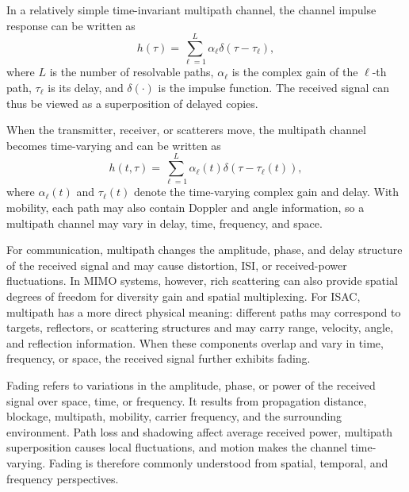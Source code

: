 In a relatively simple time-invariant multipath channel,
the channel impulse response can be written as
\begin{equation}
    h(\tau)
    =
    \sum_{\ell=1}^{L}
    \alpha_{\ell}
    \delta
    \left(
        \tau-\tau_{\ell}
    \right),
    \label{eq:time-invariant-multipath-channel}
\end{equation}
where \(L\) is the number of resolvable paths, \(\alpha_{\ell}\) is the
complex gain of the \(\ell\)-th path, \(\tau_{\ell}\) is its delay, and
\(\delta(\cdot)\) is the impulse function.
The received signal can thus be viewed as a superposition of delayed copies.

When the transmitter, receiver, or scatterers move, the multipath channel
becomes time-varying and can be written as
\begin{equation}
    h(t,\tau)
    =
    \sum_{\ell=1}^{L}
    \alpha_{\ell}(t)
    \delta
    \left(
        \tau-\tau_{\ell}(t)
    \right),
    \label{eq:time-varying-multipath-channel}
\end{equation}
where \(\alpha_{\ell}(t)\) and \(\tau_{\ell}(t)\) denote the time-varying
complex gain and delay.
With mobility, each path may also contain Doppler and angle information, so a
multipath channel may vary in delay, time, frequency, and space.

For communication, multipath changes the amplitude, phase, and delay structure
of the received signal and may cause distortion, ISI, or received-power
fluctuations.
In MIMO systems, however, rich scattering can also provide spatial degrees of
freedom for diversity gain and spatial multiplexing.
For ISAC, multipath has a more direct physical meaning: different paths may
correspond to targets, reflectors, or scattering structures and may carry range,
velocity, angle, and reflection information.
When these components overlap and vary in time, frequency, or space, the
received signal further exhibits fading.



Fading refers to variations in the amplitude, phase, or power of the received
signal over space, time, or frequency.
It results from propagation distance, blockage, multipath, mobility, carrier
frequency, and the surrounding environment.
Path loss and shadowing affect average received power, multipath superposition
causes local fluctuations, and motion makes the channel time-varying.
Fading is therefore commonly understood from spatial, temporal, and frequency
perspectives.


